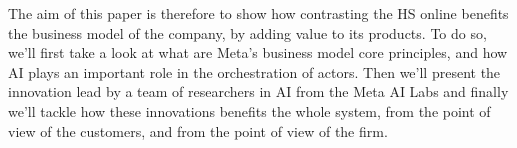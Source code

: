 
The aim of this paper is therefore to show how contrasting the HS
online benefits the business model of the company, by adding value to
its products. To do so, we'll first take a look at what are Meta's
business model core principles, and how AI plays an important role in
the orchestration of actors. Then we'll present the innovation lead by
a team of researchers in AI from the Meta AI Labs and finally we'll
tackle how these innovations benefits the whole system, from the point
of view of the customers, and from the point of view of the firm.

